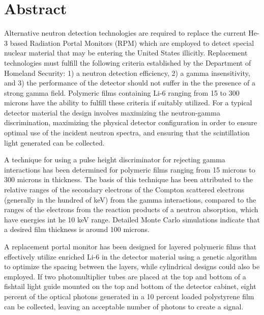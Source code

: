 \chapter*{Abstract}
\label{chap:abstract}
Alternative neutron detection technologies are required to replace the current He-3 based Radiation Portal Monitors (RPM) which are employed to detect special nuclear material that may be entering the United States illicitly.
Replacement technologies must fulfill the following criteria established by the Department of Homeland Security: 1) a neutron detection efficiency, 2) a gamma insensitivity, and 3) the performance of the detector should not suffer in the the presence of a strong gamma field.
Polymeric films containing Li-6 ranging from 15 to 300 microns have the ability to fulfill these criteria if suitably utilized.
For a typical detector material the design involves maximizing the neutron-gamma discrimination, maximizing the physical detector configuration in order to ensure optimal use of the incident neutron spectra, and ensuring that the scintillation light generated can be collected.

A technique for using a pulse height discriminator for rejecting gamma interactions has been determined for polymeric films  ranging from 15 microns to 300 microns in thickness.
The basis of this technique has been attributed to the relative ranges of the secondary electrons of the Compton scattered electrons (generally in the hundred of keV) from the gamma interactions, compared to the ranges of the electrons from the reaction products of a neutron absorption, which have energies int he 10 keV range.
Detailed Monte Carlo simulations indicate that a desired film thickness is around 100 microns.

A replacement portal monitor has been designed for layered polymeric films that effectively utilize enriched Li-6 in the detector material using a genetic algorithm to optimize the spacing between the layers, while cylindrical designs could also be employed.
If two photomultiplier tubes are placed at the top and bottom of a fishtail light guide mounted on the top and bottom of the detector cabinet, eight percent of the optical photons generated in a 10 percent loaded polystyrene film can be collected, leaving an acceptable number of photons to create a signal.
